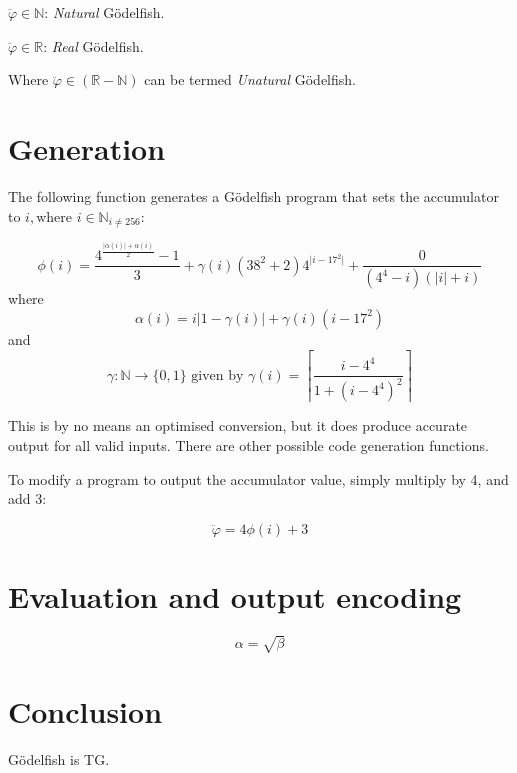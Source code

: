 \documentclass{article}
\begin{document}
$\ddot{\varphi} \in \mathbb{N}$: \textit{Natural} Gödelfish.

$\ddot{\varphi} \in \mathbb{R}$: \textit{Real} Gödelfish.

Where
$\ddot{\varphi} \in (\mathbb{R} - \mathbb{N})$ can be termed \textit{Unatural} Gödelfish.


\section{Generation}
The following function generates a Gödelfish program that sets the accumulator to $i, \text{where } i \in \mathbb{N}_{i\ne256}$:

\[
\phi(i) = \frac{4^{\frac{\lvert\alpha(i)\rvert + \alpha(i)}{2}} - 1}{3} 
+ \gamma(i)(38^2 + 2)4^{\lvert i-17^2\rvert}
+ \frac{0}{(4^4 - i)(\lvert i \rvert + i)}
\]
where
\[
\alpha(i) = i \big\lvert 1-\gamma(i) \big\rvert
+ \gamma(i)(i - 17^{2})
\]
and
\[
\gamma: \mathbb{N} \to \{0, 1\} \text{ given by } \gamma(i) = \left\lceil\frac{i - 4^{4}}{1 + (i - 4^{4})^{2}}\right\rceil
\]


This is by no means an optimised conversion, but it does produce accurate output for all valid inputs.
There are other possible code generation functions.


To modify a program to output the accumulator value, simply multiply by 4, and add 3:

\[
\ddot{\varphi} = 4\phi(i) + 3
\]

\section{Evaluation and output encoding}


\begin{equation}
    \label{simple_equation}
    \alpha = \sqrt{ \beta }
\end{equation}


\section{Conclusion}
Gödelfish is TG.
\end{document}
